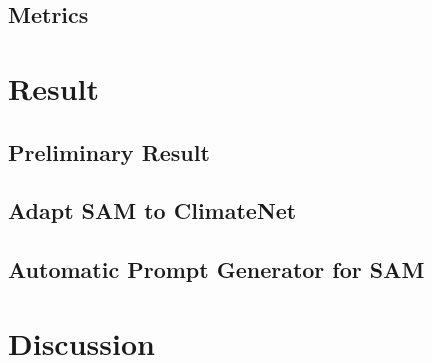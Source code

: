 



\section{Metrics}

\chapter{Result}
\section{Preliminary Result}

\section{Adapt SAM to ClimateNet}


\section{Automatic Prompt Generator for SAM}



\chapter{Discussion}

% 



